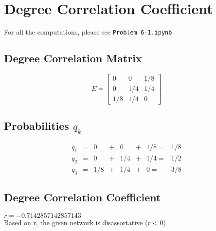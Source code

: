 \documentclass[../document.tex]{subfiles}
\begin{document}
\section{Degree Correlation Coefficient}
For all the computations, please see \texttt{Problem 6-1.ipynb}
\subsection{Degree Correlation Matrix}
\[
 	E = 
 	\begin{bmatrix}
 	0     &  0   & 1/8 \\
 	0     & 1/4 & 1/4 \\
  	1/8  & 1/4 & 0
 	\end{bmatrix}
\]

\subsection{Probabilities $q_k$}
\[{
\begin{array}{cccccccc}
q_1 &=& 0&+&0&+&1/8 =&1/8 \\
q_2 &=& 0&+&1/4&+&1/4 =&1/2 \\
q_3 &=& 1/8&+&1/4&+&0 =&3/8 
\end{array}
}\]
\subsection{Degree Correlation Coefficient}
$r = -0.7142857142857143$\\

Based on r, the given network is disassortative ($r < 0$)
\end{document}
